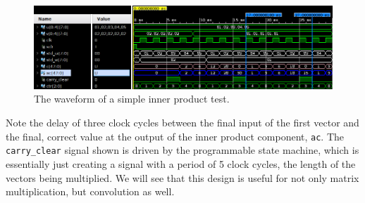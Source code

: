 \begin{figure}[H]
\includegraphics[width=\textwidth]{inner_product_verify.png}
\caption{The waveform of a simple inner product test.}
\label{fig:inner_product_verify}
\centering
\end{figure}

Note the delay of three clock cycles between the final input of the first vector and the final, correct value at the output of the inner product component, \verb|ac|.  The \verb|carry_clear| signal shown is driven by the programmable state machine, which is essentially just creating a signal with a period of 5 clock cycles, the length of the vectors being multiplied.  We will see that this design is useful for not only matrix multiplication, but convolution as well.




